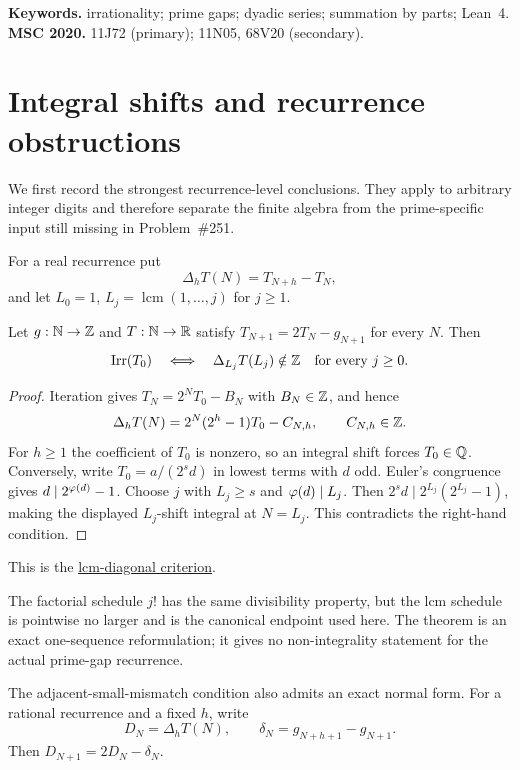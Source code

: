 \documentclass[11pt]{article}
\begin{document}
\medskip
\noindent\textbf{Keywords.} irrationality; prime gaps; dyadic series;
summation by parts; Lean~4.
\qquad\textbf{MSC 2020.} 11J72 (primary); 11N05, 68V20 (secondary).

\section{Integral shifts and recurrence obstructions}\label{sec:diagonal-collapse}

We first record the strongest recurrence-level conclusions.  They apply to
arbitrary integer digits and therefore separate the finite algebra from the
prime-specific input still missing in Problem~\#251.

For a real recurrence put
\[
 \Delta_hT(N)=T_{N+h}-T_N,
\]
and let $L_0=1$, $L_j=\operatorname{lcm}(1,\ldots,j)$ for $j\ge1$.

\begin{theorem}\label{res:lcmdiagonal}
Let $g:\mathbb{N}\to\mathbb{Z}$ and $T:\mathbb{N}\to\mathbb{R}$ satisfy
$T_{N+1}=2T_N-g_{N+1}$ for every $N$.  Then
\[
 \operatorname{Irr}(T_0)
 \quad\Longleftrightarrow\quad
 \Delta_{L_j}T(L_j)\notin\mathbb{Z}
 \quad\hbox{for every }j\ge0.
\]
\end{theorem}

\begin{proof}
Iteration gives $T_N=2^NT_0-B_N$ with $B_N\in\mathbb{Z}$, and hence
\[
 \Delta_hT(N)=2^N(2^h-1)T_0-C_{N,h},\qquad C_{N,h}\in\mathbb{Z}.
\]
For $h\ge1$ the coefficient of $T_0$ is nonzero, so an integral shift
forces $T_0\in\mathbb{Q}$.  Conversely, write
$T_0=a/(2^sd)$ in lowest terms with $d$ odd.  Euler's congruence gives
$d\mid2^{\varphi(d)}-1$.  Choose $j$ with $L_j\ge s$ and $\varphi(d)\mid L_j$.
Then $2^s d\mid2^{L_j}(2^{L_j}-1)$, making the displayed $L_j$-shift
integral at $N=L_j$.  This contradicts the right-hand condition.
\end{proof}

\noindent This is the \href{https://github.com/wcook04/plectis-erdos/blob/f36a98bf3d3e6f65f1074e3b800e3293d5b8a51a/ErdosProblems/Erdos251/OrderLatticeDiagonal.lean#L153}{lcm-diagonal criterion}.

The factorial schedule $j!$ has the same divisibility property, but the lcm
schedule is pointwise no larger and is the canonical endpoint used here.  The
theorem is an exact one-sequence reformulation; it gives no non-integrality
statement for the actual prime-gap recurrence.

The adjacent-small-mismatch condition also admits an exact normal form.  For a
rational recurrence and a fixed $h$, write
\[
 D_N=\Delta_hT(N),\qquad
 \delta_N=g_{N+h+1}-g_{N+1}.
\]
Then $D_{N+1}=2D_N-\delta_N$.
\end{document}
